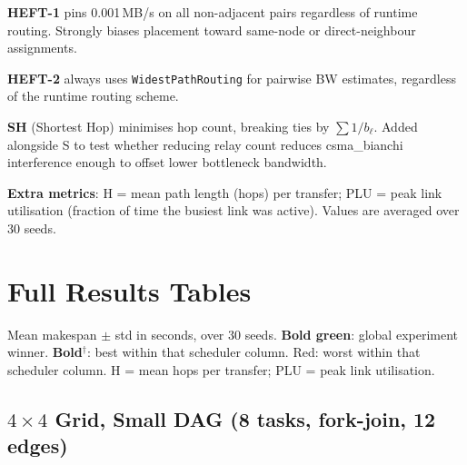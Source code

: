 \documentclass[11pt]{article}
\newcommand{\win}[1]{\textcolor{green!50!black}{\textbf{#1}}}
\newcommand{\bad}[1]{\textcolor{red!70!black}{#1}}
\begin{document}
\medskip\noindent
\textbf{HEFT-1} pins 0.001\,MB/s on all non-adjacent pairs regardless of runtime
routing.  Strongly biases placement toward same-node or direct-neighbour assignments.

\medskip\noindent
\textbf{HEFT-2} always uses \texttt{WidestPathRouting} for pairwise BW estimates,
regardless of the runtime routing scheme.

\medskip\noindent
\textbf{SH} (Shortest Hop) minimises hop count, breaking ties by $\sum 1/b_\ell$.
Added alongside S to test whether reducing relay count reduces csma\_bianchi
interference enough to offset lower bottleneck bandwidth.

\medskip\noindent
\textbf{Extra metrics}: H = mean path length (hops) per transfer;
PLU = peak link utilisation (fraction of time the busiest link was active).
Values are averaged over 30 seeds.


\section{Full Results Tables}

Mean makespan $\pm$ std in seconds, over 30 seeds.
\win{Bold green}: global experiment winner.
\textbf{Bold}$^\dagger$: best within that scheduler column.
\bad{Red}: worst within that scheduler column.
H = mean hops per transfer; PLU = peak link utilisation.

\subsection{$4\times4$ Grid, Small DAG (8 tasks, fork-join, 12 edges)}
\end{document}
